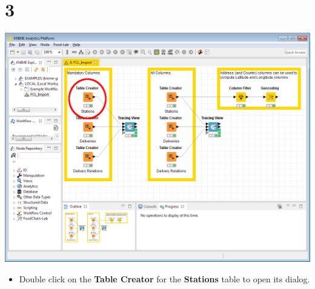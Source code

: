 \documentclass{beamer}
\begin{document}
\section{3}
\begin{frame}
	\begin{center}
  		\includegraphics[height=0.6\textheight]{3.png}
	\end{center}
	\begin{itemize}
		\item Double click on the \textbf{Table Creator} for the \textbf{Stations} table to open its dialog.
	\end{itemize}
\end{frame}
\end{document}
